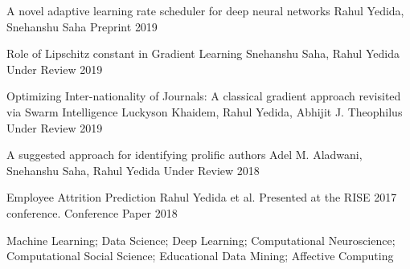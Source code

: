 


\begin{cvhonors}

  \cvhonor
    {A novel adaptive learning rate scheduler for deep neural networks}
    {Rahul Yedida, Snehanshu Saha}
    {Preprint} %
    {2019} %

  \cvhonor
    {Role of Lipschitz constant in Gradient Learning}
    {Snehanshu Saha, Rahul Yedida}
    {Under Review} %
    {2019} %

  \cvhonor
    {Optimizing Inter-nationality of Journals: A classical gradient approach revisited via Swarm Intelligence}
    {Luckyson Khaidem, Rahul Yedida, Abhijit J. Theophilus}
    {Under Review} %
    {2019} %
    
  \cvhonor
    {A suggested approach for identifying prolific authors}
    {Adel M. Aladwani, Snehanshu Saha, Rahul Yedida}
    {Under Review} %
    {2018} %

  \cvhonor
    {Employee Attrition Prediction}
    {Rahul Yedida et al. Presented at the RISE 2017 conference.}
    {Conference Paper}
    {2018}

\end{cvhonors}


Machine Learning; Data Science; Deep Learning; Computational Neuroscience; Computational Social Science; Educational Data Mining; Affective Computing \\ \\